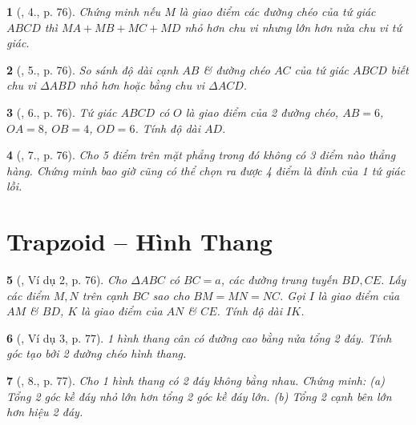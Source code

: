 \documentclass{article}
\newtheorem{baitoan}{}
\begin{document}
\begin{baitoan}[\cite{Binh_Toan_8_tap_1}, 4., p. 76]
	Chứng minh nếu $M$ là giao điểm các đường chéo của tứ giác $ABCD$ thì $MA + MB + MC + MD$ nhỏ hơn chu vi nhưng lớn hơn nửa chu vi tứ giác.
\end{baitoan}

\begin{baitoan}[\cite{Binh_Toan_8_tap_1}, 5., p. 76]
	So sánh độ dài cạnh $AB$ \& đường chéo $AC$ của tứ giác $ABCD$ biết chu vi $\Delta ABD$ nhỏ hơn hoặc bằng chu vi $\Delta ACD$.
\end{baitoan}

\begin{baitoan}[\cite{Binh_Toan_8_tap_1}, 6., p. 76]
	Tứ giác $ABCD$ có $O$ là giao điểm của 2 đường chéo, $AB = 6$, $OA = 8$, $OB = 4$, $OD = 6$. Tính độ dài $AD$.
\end{baitoan}

\begin{baitoan}[\cite{Binh_Toan_8_tap_1}, 7., p. 76]
	Cho 5 điểm trên mặt phẳng trong đó không có 3 điểm nào thẳng hàng. Chứng minh bao giờ cũng có thể chọn ra được 4 điểm là đỉnh của 1 tứ giác lồi.
\end{baitoan}


\section{Trapzoid -- Hình Thang}

\begin{baitoan}[\cite{Binh_Toan_8_tap_1}, Ví dụ 2, p. 76]
	Cho $\Delta ABC$ có $BC = a$, các đường trung tuyến $BD,CE$. Lấy các điểm $M,N$ trên cạnh $BC$ sao cho $BM = MN = NC$. Gọi $I$ là giao điểm của $AM$ \& $BD$, $K$ là giao điểm của $AN$ \& $CE$. Tính độ dài $IK$.
\end{baitoan}

\begin{baitoan}[\cite{Binh_Toan_8_tap_1}, Ví dụ 3, p. 77]
	1 hình thang cân có đường cao bằng nửa tổng 2 đáy. Tính góc tạo bởi 2 đường chéo hình thang.
\end{baitoan}

\begin{baitoan}[\cite{Binh_Toan_8_tap_1}, 8., p. 77]
	Cho 1 hình thang có 2 đáy không bằng nhau. Chứng minh: (a) Tổng 2 góc kề đáy nhỏ lớn hơn tổng 2 góc kề đáy lớn. (b) Tổng 2 cạnh bên lớn hơn hiệu 2 đáy.
\end{baitoan}
\end{document}
